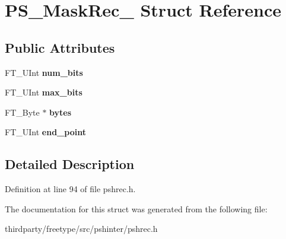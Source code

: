 \hypertarget{struct_p_s___mask_rec__}{}\section{P\+S\+\_\+\+Mask\+Rec\+\_\+ Struct Reference}
\label{struct_p_s___mask_rec__}
\subsection*{Public Attributes}
\begin{DoxyCompactItemize}
\item 
\mbox{\label{struct_p_s___mask_rec___aaa6067e8b00aab3959c00ed4822b78df}} 
F\+T\+\_\+\+U\+Int {\bfseries num\+\_\+bits}
\item 
\mbox{\label{struct_p_s___mask_rec___a53e3d96ef77393a7c1bf789f3e242b08}} 
F\+T\+\_\+\+U\+Int {\bfseries max\+\_\+bits}
\item 
\mbox{\label{struct_p_s___mask_rec___af9cf1260cc7fa966da92a7837a09e75f}} 
F\+T\+\_\+\+Byte $\ast$ {\bfseries bytes}
\item 
\mbox{\label{struct_p_s___mask_rec___a521beb50ceb5c7125ecd3ecccad918b0}} 
F\+T\+\_\+\+U\+Int {\bfseries end\+\_\+point}
\end{DoxyCompactItemize}


\subsection{Detailed Description}


Definition at line 94 of file pshrec.\+h.



The documentation for this struct was generated from the following file\+:\begin{DoxyCompactItemize}
\item 
thirdparty/freetype/src/pshinter/pshrec.\+h\end{DoxyCompactItemize}
